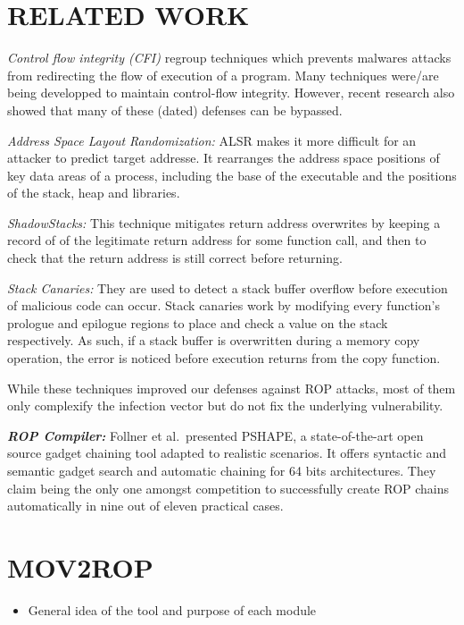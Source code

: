 \documentclass[10pt,twocolumn]{article}
\begin{document}
\section{RELATED WORK}

\textit{Control flow integrity (CFI)} regroup techniques which prevents malwares
attacks from redirecting the flow of execution of a program. Many techniques
were/are being developped to maintain control-flow integrity. However, recent
research also showed that many of these (dated) defenses can be bypassed.

\textit{Address Space Layout Randomization:} ALSR makes it more difficult for
an attacker to predict target addresse. It rearranges the address space
positions of key data areas of a process, including the base of the executable
and the positions of the stack, heap and libraries.

\textit{ShadowStacks\cite{Sinnadurai_transparentruntime}:} This technique
mitigates return address overwrites by keeping a record of of the legitimate
return address for some function call, and then to check that the return
address is still correct before returning.

\textit{Stack Canaries:} They are used to detect a stack buffer overflow before
execution of malicious code can occur. Stack canaries work by modifying every
function's prologue and epilogue regions to place and check a value on the
stack respectively. As such, if a stack buffer is overwritten during a memory
copy operation, the error is noticed before execution returns from the copy
function.

While these techniques improved our defenses against ROP attacks, most of them only
 complexify the infection vector but do not fix the underlying vulnerability.

\textbf{\textit{ROP Compiler:}} Follner et al.\ presented
PSHAPE\cite{barthe_pshape:_2016}, a state-of-the-art open source gadget
chaining tool adapted to realistic scenarios. It offers syntactic and semantic
gadget search and automatic chaining for 64 bits architectures.  They claim
being the only one amongst competition to successfully create ROP chains
automatically in nine out of eleven practical cases.


\section{MOV2ROP}
\begin{itemize}
    \item General idea of the tool and purpose of each module
\end{itemize}
\end{document}
